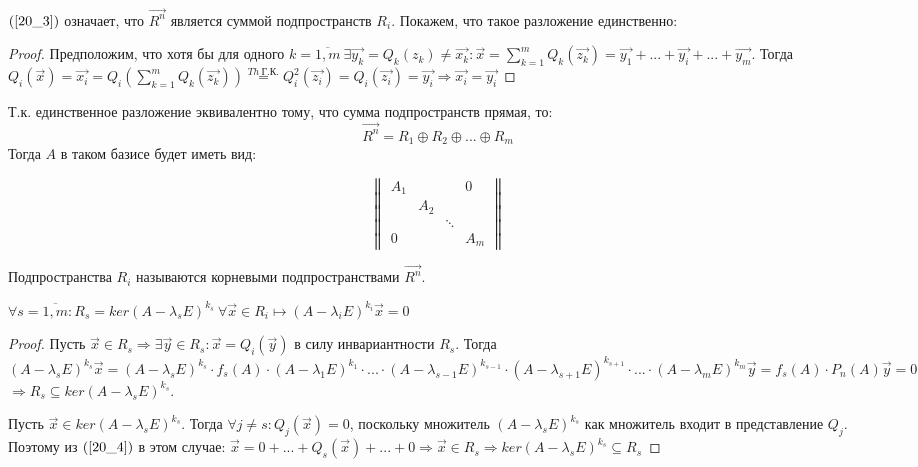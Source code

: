 $(\ref{20_3})$ означает, что $\vec{R^n}$ является суммой подпространств $R_i$. Покажем, что такое разложение единственно:
\begin{proof}
Предположим, что хотя бы для одного $k = \overline{1,m}~ \exists \vec{y_k} = Q_k(z_k) \neq \vec{x_k} : \vec{x} = \sum\limits_{k=1}^m{Q_k(\vec{z_k})} = \vec{y_1} + ... + \vec{y_i} + ... + \vec{y_m}$. Тогда $Q_i(\vec{x}) = \vec{x_i} = Q_i \left(\sum\limits_{k=1}^m{Q_k(\vec{z_k})}\right) \stackrel{Th~ \text{Г.К.}}{=} Q_i^2(\vec{z_i}) = Q_i(\vec{z_i}) = \vec{y_i} \Rightarrow \vec{x_i} = \vec{y_i}$
\end{proof}

Т.к. единственное разложение эквивалентно тому, что сумма подпространств прямая, то:
\[\vec{R^n} = R_1 \oplus R_2 \oplus ... \oplus R_m\]
Тогда $A$ в таком базисе будет иметь вид:

\begin{equation*}
\begin{Vmatrix}
  A_1 &     &        & 0   \\
      & A_2 &        &     \\
      &     & \ddots &     \\
  0   &     &        & A_m
\end{Vmatrix}
\end{equation*}

Подпространства $R_i$ называются корневыми подпространствами $\vec{R^n}$.

\begin{theorem}
$\forall s = \overline{1,m} : R_s = ker(A - \lambda_s E)^{k_s}~ \forall \vec{x} \in R_i \longmapsto (A - \lambda_i E)^{k_i} \vec{x} = 0$
\begin{proof}
Пусть $\vec{x} \in R_s \Rightarrow \exists \vec{y} \in R_s : \vec{x} = Q_i(\vec{y})$ в силу инвариантности $R_s$. Тогда $(A - \lambda_s E)^{k_s} \vec{x} = (A - \lambda_s E)^{k_s} \cdot f_s(A) \cdot (A - \lambda_1 E)^{k_1} \cdot ... \cdot (A - \lambda_{s-1} E)^{k_{s-1}} \cdot (A - \lambda_{s+1} E)^{k_{s+1}} \cdot ... \cdot (A - \lambda_m E)^{k_m} \vec{y} = f_s(A) \cdot P_n(A)\vec{y} = 0$
$ \Rightarrow R_s \subseteq ker(A - \lambda_s E) ^ {k_s}$.

Пусть $\vec{x} \in ker(A - \lambda_s E)^{k_s}$. Тогда $\forall j \neq s: Q_j(\vec{x}) = 0$, поскольку множитель $(A - \lambda_s E)^{k_s}$ как множитель входит в представление $Q_j$. Поэтому из $(\ref{20_4})$ в этом случае: $\vec{x} = 0 + ... + Q_s(\vec{x}) + ... + 0 \Rightarrow \vec{x} \in R_s \Rightarrow ker(A-\lambda_s E)^{k_s} \subseteq R_s$
\end{proof}
\end{theorem}

